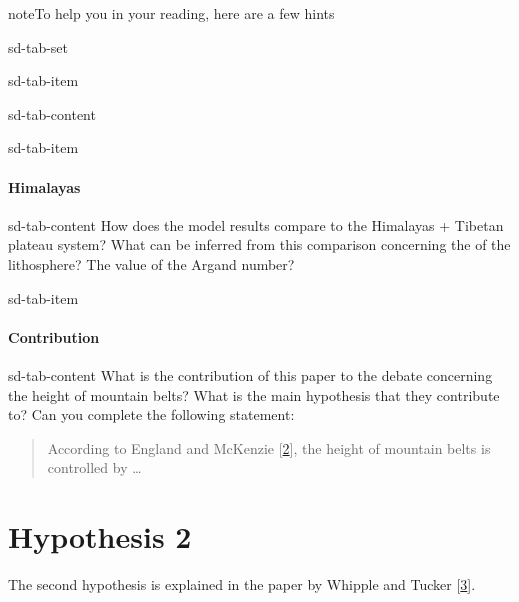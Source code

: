 \documentclass[letterpaper,10pt,english]{jupyterBook}
\begin{document}
\begin{sphinxadmonition}{note}{To help you in your reading, here are a few hints}
\begin{sphinxuseclass}{sd-tab-set}
\begin{sphinxuseclass}{sd-tab-item}
\begin{sphinxuseclass}{sd-tab-content}
\end{sphinxuseclass}
\end{sphinxuseclass}
\begin{sphinxuseclass}{sd-tab-item}\subsubsection*{Himalayas}

\begin{sphinxuseclass}{sd-tab-content}
\sphinxAtStartPar
How does the model results compare to the Himalayas + Tibetan plateau system? What can be inferred from this comparison concerning the {\hyperref[\detokenize{glossary:term-Rheology}]{}} of the lithosphere? The value of the Argand number?

\end{sphinxuseclass}
\end{sphinxuseclass}
\begin{sphinxuseclass}{sd-tab-item}\subsubsection*{Contribution}

\begin{sphinxuseclass}{sd-tab-content}
\sphinxAtStartPar
What is the contribution of this paper to the debate concerning the height of mountain belts? What is the main hypothesis that they contribute to? Can you complete the following statement:
\begin{quote}

\sphinxAtStartPar
According to England and McKenzie {[}\hyperlink{cite.references:id6}{2}{]}, the height of mountain belts is controlled by …
\end{quote}

\end{sphinxuseclass}
\end{sphinxuseclass}
\end{sphinxuseclass}\end{sphinxadmonition}

\sphinxstepscope


\chapter{Hypothesis 2}
\label{\detokenize{hypothesis2:hypothesis-2}}\label{\detokenize{hypothesis2::doc}}
\sphinxAtStartPar
The second hypothesis is explained in the paper by Whipple and Tucker {[}\hyperlink{cite.references:id3}{3}{]}.
\end{document}
